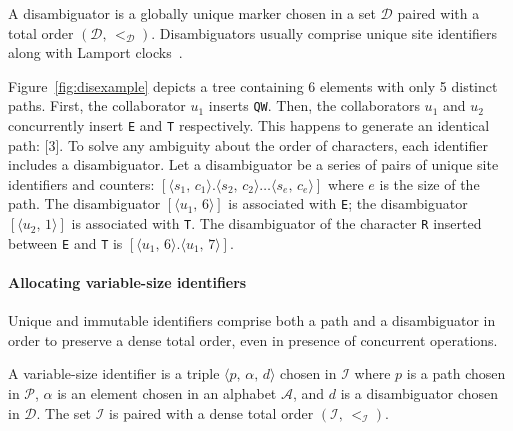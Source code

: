\begin{definition}[Disambiguator]
  A disambiguator is a globally unique marker chosen in a set $\mathcal{D}$
  paired with a total order $(\mathcal{D},\, <_\mathcal{D})$. Disambiguators
  usually comprise unique site identifiers along with Lamport
  clocks~\cite{lamport1978time}.
\end{definition}

Figure~\ref{fig:disexample} depicts a tree containing 6 elements with only 5
distinct paths. First, the collaborator $u_1$ inserts \texttt{QW}.  Then, the
collaborators $u_1$ and $u_2$ concurrently insert \texttt{E} and \texttt{T}
respectively. This happens to generate an identical path: [$3$]. To solve any
ambiguity about the order of characters, each identifier includes a
disambiguator.  Let a disambiguator be a series of pairs of unique site
identifiers and counters:
$[\langle s_1,\, c_1 \rangle.\langle s_2,\, c_2 \rangle \ldots \langle s_e,\,
c_e \rangle]$
where $e$ is the size of the path.  The disambiguator
$[\langle u_1,\, 6\rangle]$ is associated with \texttt{E}; the disambiguator
$[\langle u_2,\, 1\rangle]$ is associated with \texttt{T}. The disambiguator of
the character \texttt{R} inserted between \texttt{E} and \texttt{T} is
$[\langle u_1,\, 6\rangle.\langle u_1,\, 7\rangle]$.

\paragraph{Allocating variable-size identifiers}

Unique and immutable identifiers comprise both a path and a disambiguator in
order to preserve a dense total order, even in presence of concurrent
operations.

\begin{definition}
  A variable-size identifier is a triple $\langle p,\, \alpha,\, d \rangle$
  chosen in $\mathcal{I}$ where $p$ is a path chosen in $\mathcal{P}$, $\alpha$
  is an element chosen in an alphabet $\mathcal{A}$, and $d$ is a disambiguator
  chosen in $\mathcal{D}$. The set $\mathcal{I}$ is paired with a dense total
  order $(\mathcal{I},\,<_\mathcal{I})$.
\end{definition}

